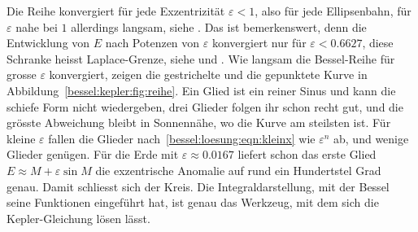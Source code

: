 Die Reihe konvergiert für jede Exzentrizität $\varepsilon<1$, also für jede Ellipsenbahn, für $\varepsilon$ nahe bei $1$ allerdings langsam, siehe \cite[Kapitel~XVII]{bessel:watson}.
Das ist bemerkenswert, denn die Entwicklung von $E$ nach Potenzen von $\varepsilon$ konvergiert nur für $\varepsilon<0.6627$, diese Schranke heisst Laplace-Grenze, siehe \cite[S.~270]{bessel:watson} und \cite[Abschnitt~4.8]{bessel:finch}.
%
Wie langsam die Bessel-Reihe für grosse $\varepsilon$ konvergiert, zeigen die gestrichelte und die gepunktete Kurve in Abbildung~\ref{bessel:kepler:fig:reihe}.
Ein Glied ist ein reiner Sinus und kann die schiefe Form nicht wiedergeben, drei Glieder folgen ihr schon recht gut, und die grösste Abweichung bleibt in Sonnennähe, wo die Kurve am steilsten ist.
Für kleine $\varepsilon$ fallen die Glieder nach~\eqref{bessel:loesung:eqn:kleinx} wie $\varepsilon^n$ ab, und wenige Glieder genügen.
Für die Erde mit $\varepsilon\approx 0.0167$ liefert schon das erste Glied $E\approx M+\varepsilon\sin M$ die exzentrische Anomalie auf rund ein Hundertstel Grad genau.
Damit schliesst sich der Kreis.
Die Integraldarstellung, mit der Bessel seine Funktionen eingeführt hat, ist genau das Werkzeug, mit dem sich die Kepler-Gleichung lösen lässt.
